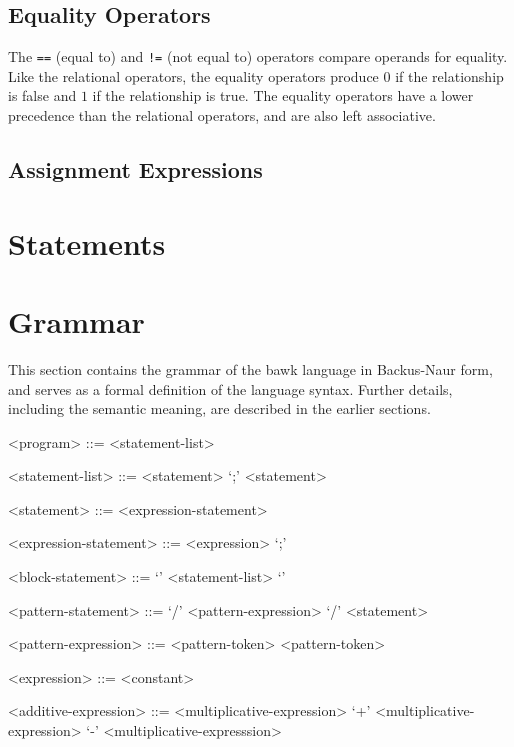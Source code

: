 \documentclass[letterpaper]{article}
\begin{document}
\subsection{Equality Operators}
The \texttt{==} (equal to) and \texttt{!=} (not equal to) operators compare operands for equality.  Like the relational operators, the equality operators produce $0$ if the relationship is false and $1$ if the relationship is true.  The equality operators have a lower precedence than the relational operators, and are also left associative.


\subsection{Assignment Expressions}


\section{Statements}


\section{Grammar}
This section contains the grammar of the bawk language in Backus-Naur form, and serves as a formal definition of the language syntax.  Further details, including the semantic meaning, are described in the earlier sections.
\begin{grammar}
<program> ::= <statement-list>

<statement-list> ::= <statement>
 `;' <statement>

<statement> ::= <expression-statement>

<expression-statement> ::= <expression> `;'

<block-statement> ::= `{' <statement-list> `}'

<pattern-statement> ::= `/' <pattern-expression> `/' <statement>

<pattern-expression> ::= <pattern-token>
 <pattern-token>


<expression> ::= <constant>

<additive-expression> ::= <multiplicative-expression>
 `+' <multiplicative-expression>
 `-' <multiplicative-expresssion>
\end{grammar}
\end{document}
